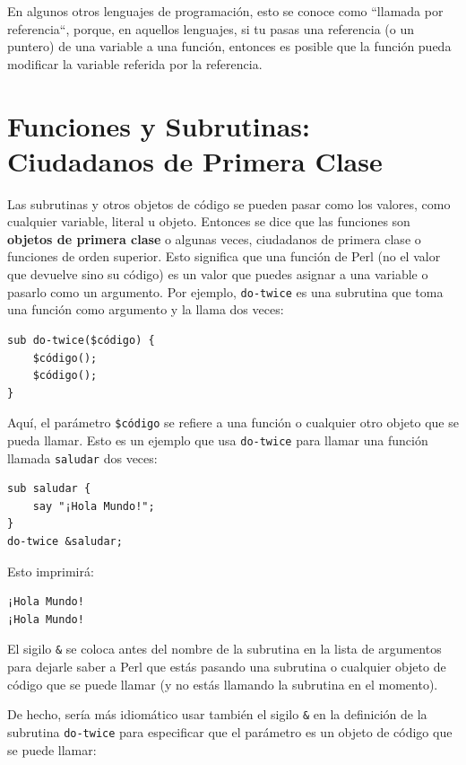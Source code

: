En algunos otros lenguajes de programación, esto se conoce como
``llamada por referencia``, porque, en aquellos lenguajes, 
si tu pasas una referencia (o un puntero) de una variable a una
función, entonces es posible que la función pueda modificar la
variable referida por la referencia.


\section{Funciones y Subrutinas: Ciudadanos de Primera Clase}
\label{first_class}

Las subrutinas y otros objetos de código se pueden pasar como 
los valores, como cualquier variable, literal u objeto. Entonces
se dice que las funciones son {\bf objetos de primera clase} o algunas
veces, ciudadanos de primera clase o funciones de orden superior. 
Esto significa que una función de Perl (no el valor que devuelve sino
su código) es un valor que puedes asignar a una variable o pasarlo como
un argumento. Por ejemplo, \verb|do-twice| es una subrutina que toma
una función como argumento y la llama dos veces:

\begin{verbatim}
sub do-twice($código) {
    $código(); 
    $código();
}
\end{verbatim}

Aquí, el parámetro \verb|$código| se refiere a una función o cualquier
otro objeto que se pueda llamar. Esto es un ejemplo que usa \verb|do-twice|
para llamar una función llamada \verb|saludar| dos veces:

\begin{verbatim}
sub saludar {
    say "¡Hola Mundo!";
}
do-twice &saludar;
\end{verbatim}

Esto imprimirá:
\begin{verbatim}
¡Hola Mundo!
¡Hola Mundo!
\end{verbatim}

El sigilo \verb|&| se coloca antes del nombre de la subrutina 
en la lista de argumentos para dejarle saber a Perl que estás
pasando una subrutina o cualquier objeto de código 
que se puede llamar (y no estás llamando la
subrutina en el momento).

De hecho, sería más idiomático usar también el sigilo \verb|&|
en la definición de la subrutina \verb|do-twice| para especificar
que el parámetro es un objeto de código que se puede llamar:

